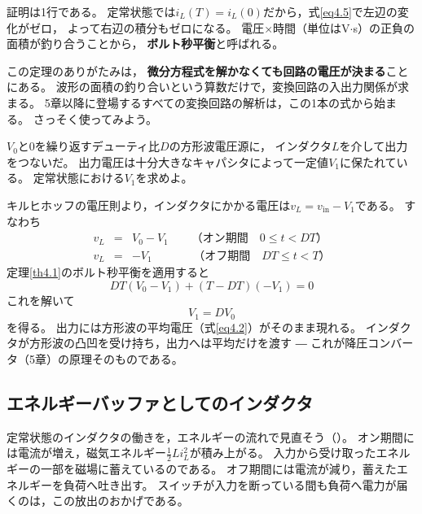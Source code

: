 証明は1行である。
定常状態では$i_L(T) = i_L(0)$だから，式\ref{eq4.5}で左辺の変化がゼロ，
よって右辺の積分もゼロになる。
電圧×時間（単位はV$\cdot$s）の正負の面積が釣り合うことから，
\textbf{ボルト秒平衡}と呼ばれる。

この定理のありがたみは，
\textbf{微分方程式を解かなくても回路の電圧が決まる}ことにある。
波形の面積の釣り合いという算数だけで，変換回路の入出力関係が求まる。
5章以降に登場するすべての変換回路の解析は，この1本の式から始まる。
さっそく使ってみよう。

\begin{例題}[ボルト秒平衡で出力電圧を求める]
\label{rei4.1}
$V_0$と$0$を繰り返すデューティ比$D$の方形波電圧源に，
インダクタ$L$を介して出力をつないだ。
出力電圧は十分大きなキャパシタによって一定値$V_1$に保たれている。
定常状態における$V_1$を求めよ。
\begin{解答}
キルヒホッフの電圧則より，インダクタにかかる電圧は$v_L = v_{\mathrm{in}} - V_1$である。
すなわち
\begin{eqnarray}
v_L &=& V_0 - V_1
\qquad\mbox{（オン期間　$0 \le t < DT$）} \nonumber\\
v_L &=& -V_1
\qquad\quad\ \ \,\mbox{（オフ期間　$DT \le t < T$）} \nonumber
\end{eqnarray}
定理\ref{th4.1}のボルト秒平衡を適用すると
\begin{equation*}
DT(V_0 - V_1) + (T - DT)(-V_1) = 0
\end{equation*}
これを解いて
\begin{equation*}
V_1 = DV_0
\end{equation*}
を得る。
出力には方形波の平均電圧（式\ref{eq4.2}）がそのまま現れる。
インダクタが方形波の凸凹を受け持ち，出力へは平均だけを渡す ―
これが降圧コンバータ（5章）の原理そのものである。
\end{解答}
\end{例題}

\subsection{エネルギーバッファとしてのインダクタ}

定常状態のインダクタの働きを，エネルギーの流れで見直そう（）。
オン期間には電流が増え，磁気エネルギー$\frac{1}{2}Li_L^2$が積み上がる。
入力から受け取ったエネルギーの一部を磁場に蓄えているのである。
オフ期間には電流が減り，蓄えたエネルギーを負荷へ吐き出す。
スイッチが入力を断っている間も負荷へ電力が届くのは，この放出のおかげである。

